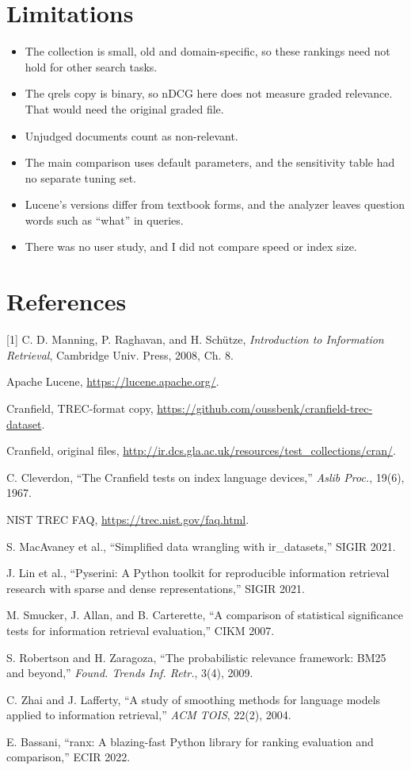 \section{Limitations}
\begin{itemize}
\item The collection is small, old and domain-specific, so these rankings need not hold for other search tasks.
\item The qrels copy is binary, so nDCG here does not measure graded relevance. That would need the original graded file.
\item Unjudged documents count as non-relevant.
\item The main comparison uses default parameters, and the sensitivity table had no separate tuning set.
\item Lucene's versions differ from textbook forms, and the analyzer leaves question words such as ``what'' in queries.
\item There was no user study, and I did not compare speed or index size.
\end{itemize}

\section*{References}
{\small
[1] C. D. Manning, P. Raghavan, and H. Sch\"utze, \emph{Introduction to Information Retrieval}, Cambridge Univ. Press, 2008, Ch. 8.\par
[2] Apache Lucene, \url{https://lucene.apache.org/}.\par
[3] Cranfield, TREC-format copy, \url{https://github.com/oussbenk/cranfield-trec-dataset}.\par
[4] Cranfield, original files, \url{http://ir.dcs.gla.ac.uk/resources/test_collections/cran/}.\par
[5] C. Cleverdon, ``The Cranfield tests on index language devices,'' \emph{Aslib Proc.}, 19(6), 1967.\par
[6] NIST TREC FAQ, \url{https://trec.nist.gov/faq.html}.\par
[7] S. MacAvaney et al., ``Simplified data wrangling with ir\_datasets,'' SIGIR 2021.\par
[8] J. Lin et al., ``Pyserini: A Python toolkit for reproducible information retrieval research with sparse and dense representations,'' SIGIR 2021.\par
[9] M. Smucker, J. Allan, and B. Carterette, ``A comparison of statistical significance tests for information retrieval evaluation,'' CIKM 2007.\par
[10] S. Robertson and H. Zaragoza, ``The probabilistic relevance framework: BM25 and beyond,'' \emph{Found. Trends Inf. Retr.}, 3(4), 2009.\par
[11] C. Zhai and J. Lafferty, ``A study of smoothing methods for language models applied to information retrieval,'' \emph{ACM TOIS}, 22(2), 2004.\par
[12] E. Bassani, ``ranx: A blazing-fast Python library for ranking evaluation and comparison,'' ECIR 2022.\par
}

